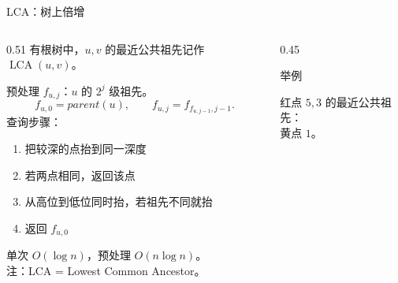 \documentclass[aspectratio=169]{beamer}
\begin{document}
\begin{frame}{LCA：树上倍增}
    \begin{columns}[T]
        \begin{column}{0.51\textwidth}
            \small
            有根树中，$u,v$ 的最近公共祖先记作 $\operatorname{LCA}(u,v)$。

            \vspace{0.3em}
            预处理 $f_{u,j}$：$u$ 的 $2^j$ 级祖先。
            \[
                f_{u,0}=parent(u),\qquad
                f_{u,j}=f_{f_{u,j-1},j-1}.
            \]
            查询步骤：
            \begin{enumerate}
                \item 把较深的点抬到同一深度
                \item 若两点相同，返回该点
                \item 从高位到低位同时抬，若祖先不同就抬
                \item 返回 $f_{u,0}$
            \end{enumerate}
            \footnotesize
            单次 $O(\log n)$，预处理 $O(n\log n)$。\\
            注：LCA = Lowest Common Ancestor。
        \end{column}
        \begin{column}{0.45\textwidth}
            \begin{exampleblock}{举例}
                \centering

                \vspace{0.6em}
                \footnotesize
                红点 $5,3$ 的最近公共祖先：\\
                黄点 $1$。
            \end{exampleblock}
        \end{column}
    \end{columns}
\end{frame}
\end{document}
